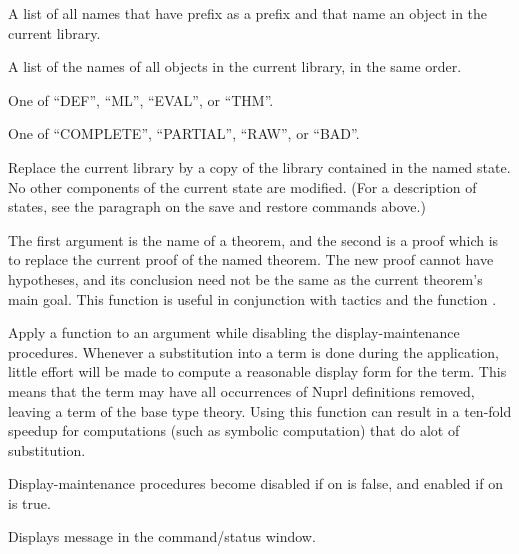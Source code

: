 



  A list of all names that have prefix as a
prefix and that name an object in the current library.

  A list of the names of all objects in the
current library, in the same order.

  One of ``DEF'', ``ML'', ``EVAL'', or ``THM''.



  One of ``COMPLETE'', ``PARTIAL'', ``RAW'',
or ``BAD''.



  Replace the current
library by a copy of the library contained in the named state.  No other
components of the current state are modified.  (For a description of
states, see the paragraph on the save and restore commands above.)

  The first argument is the name
of a theorem, and the second is a proof which is to replace the current
proof of the named theorem.  The new proof cannot have hypotheses, and
its conclusion need not be the same as the current theorem's main goal.
This function is useful in conjunction with tactics and the function
.

  Apply a
function to an argument while disabling the display-maintenance
procedures.  Whenever a substitution into a term is done during the
application, little effort will be made to compute a reasonable display
form for the term.  This means that the term may have all occurrences of
Nuprl definitions removed, leaving a term of the base type theory.
Using this function can result in a ten-fold speedup for computations
(such as symbolic computation) that do alot of substitution.

  Display-maintenance
procedures become disabled if on is false, and enabled if on is true.

 Displays message in the
command/status window.

